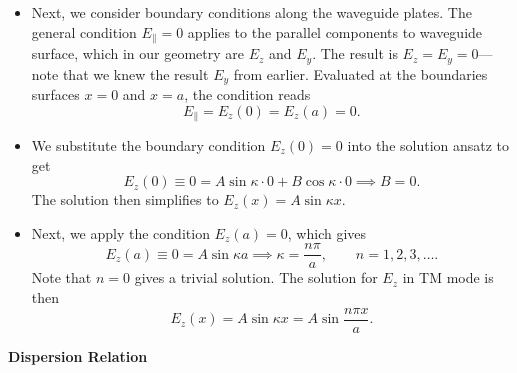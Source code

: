 \documentclass[11pt, a4paper]{article}
\begin{document}
\begin{itemize}
	\item Next, we consider boundary conditions along the waveguide plates. The general condition $ E_{\parallel} = 0 $ applies to the parallel components to waveguide surface, which in our geometry are $ E_{z} $ and $ E_{y} $. The result is $ E_{z} = E_{y} = 0 $---note that we knew the result $ E_{y} $ from earlier. Evaluated at the boundaries surfaces $ x = 0 $ and $ x = a $, the condition reads
	\begin{equation*}
		E_{\parallel} = E_{z}(0) = E_{z}(a) = 0.
	\end{equation*}
	
	\item We substitute the boundary condition $ E_{z}(0) = 0$ into the solution ansatz to get
	\begin{equation*}
		E_{z}(0) \equiv 0 = A\sin \kappa \cdot 0 + B \cos \kappa \cdot 0 \implies B = 0.
	\end{equation*}
	The solution then simplifies to $ E_{z}(x) = A\sin \kappa x  $. 
	
	\item Next, we apply the condition $ E_{z}(a) = 0 $, which gives
	\begin{equation*}
		E_{z}(a) \equiv 0 = A\sin \kappa a \implies \kappa = \frac{n\pi}{a}, \qquad n = 1, 2, 3, \ldots.
	\end{equation*}
	Note that $ n = 0 $ gives a trivial solution. The solution for $ E_{z} $ in TM mode is then
	\begin{equation*}
		E_{z}(x) = A\sin \kappa x = A \sin \frac{n\pi x}{a}.
	\end{equation*}
\end{itemize}
\textbf{Dispersion Relation}
\end{document}
